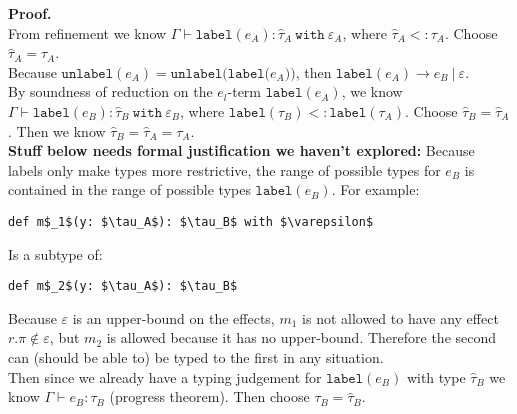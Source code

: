 \documentclass{llncs}
\newcommand{\keywadj}[1]{\mathtt{#1}}
\newcommand{\keyw}[1]{\keywadj{#1}~}
\newcommand{\kwa}[1]{\keywadj{ #1 }}
\newcommand{\type}[2]{
	#1~\keyw{with} #2
}
\begin{document}
\noindent
\textbf{Proof.} \\

\noindent
From refinement we know $\Gamma \vdash \kwa{label}(e_A) : \type{\hat \tau_A}{\varepsilon_A}$, where $\hat \tau_A <: \tau_A$. Choose $\hat \tau_A = \tau_A$. \\

\noindent 
Because $\kwa{unlabel}(e_A) = \kwa{unlabel(label(}e_A))$, then $\kwa{label}(e_A) \longrightarrow e_B~|~\varepsilon$. \\


\noindent
By soundness of reduction on the $e_l$-term $\kwa{label}(e_A)$, we know $\Gamma \vdash \kwa{label}(e_B) : \type{\hat \tau_B}{\varepsilon_B}$, where $\kwa{label}(\tau_B) <: \kwa{label}(\tau_A)$. Choose $\hat \tau_B = \hat \tau_A$. Then we know $\hat \tau_B = \hat \tau_A = \tau_A$. 
\\

\noindent
\textbf {Stuff below needs formal justification we haven't explored: }
Because labels only make types more restrictive, the range of possible types for $e_B$ is contained in the range of possible types $\kwa{label}(e_B)$. For example:

\begin{lstlisting}
def m$_1$(y: $\tau_A$): $\tau_B$ with $\varepsilon$
\end{lstlisting}

\noindent
Is a subtype of:

\begin{lstlisting}
def m$_2$(y: $\tau_A$): $\tau_B$
\end{lstlisting}

\noindent
Because $\varepsilon$ is an upper-bound on the effects, $m_1$ is not allowed to have any effect $r.\pi \notin \varepsilon$, but $m_2$ is allowed because it has no upper-bound. Therefore the second can (should be able to) be typed to the first in any situation. \\

\noindent
Then since we already have a typing judgement for $\kwa{label}(e_B)$ with type $\hat \tau_B$ we know $\Gamma \vdash e_B : \tau_B$ (progress theorem). Then choose $\tau_B = \hat \tau_B$.
\end{document}
